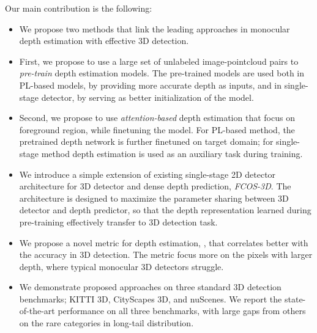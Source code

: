
Our main contribution is the following:
\begin{itemize}
    \item We propose two methods that link the leading approaches in monocular depth estimation with effective 3D detection. 
    \item First, we propose to use a large set of unlabeled image-pointcloud pairs to \emph{pre-train} depth estimation models. The pre-trained models are used both in PL-based models, by providing more accurate depth as inputs, and in single-stage detector, by serving as better initialization of the model. 
    \item Second, we propose to use \emph{attention-based} depth estimation that focus on foreground region, while finetuning the model. For PL-based method, the pretrained depth network is further finetuned on target domain; for single-stage method depth estimation is used as an auxiliary task during training.
    \item We introduce a simple extension of existing single-stage 2D detector architecture for 3D detector and dense depth prediction, \emph{FCOS-3D}. The architecture is designed to maximize the parameter sharing between 3D detector and depth predictor, so that the depth representation learned during pre-training effectively transfer to 3D detection task.  
    \item We propose a novel metric for depth estimation, , that correlates better with the accuracy in 3D detection. The metric focus more on the pixels with larger depth, where typical monocular 3D detectors struggle. 
    \item We demonstrate proposed approaches on three standard 3D detection benchmarks; KITTI 3D, CityScapes 3D, and nuScenes. We report the state-of-the-art performance on all three benchmarks, with large gaps from others on the rare categories in long-tail distribution.  
    
\end{itemize}
 
